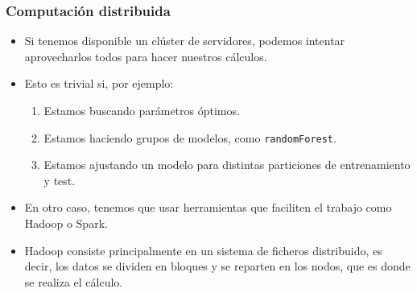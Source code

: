 \documentclass{beamer}
\begin{document}
\begin{frame}
\frametitle{Computación distribuida}

\begin{itemize}
\item Si tenemos disponible un clúster de servidores, podemos intentar aprovecharlos todos para hacer nuestros cálculos.
\item Esto es trivial si, por ejemplo:
\begin{enumerate}
\item Estamos buscando parámetros óptimos.
\item Estamos haciendo grupos de modelos, como \texttt{randomForest}.
\item Estamos ajustando un modelo para distintas particiones de entrenamiento y test.
\end{enumerate}
\item En otro caso, tenemos que usar herramientas que faciliten el trabajo como Hadoop o Spark.
\item Hadoop consiste principalmente en un sistema de ficheros distribuido, es decir, los datos se dividen en bloques y se reparten en los nodos, que es donde se realiza el cálculo.
\end{itemize}
\end{frame}
\end{document}
